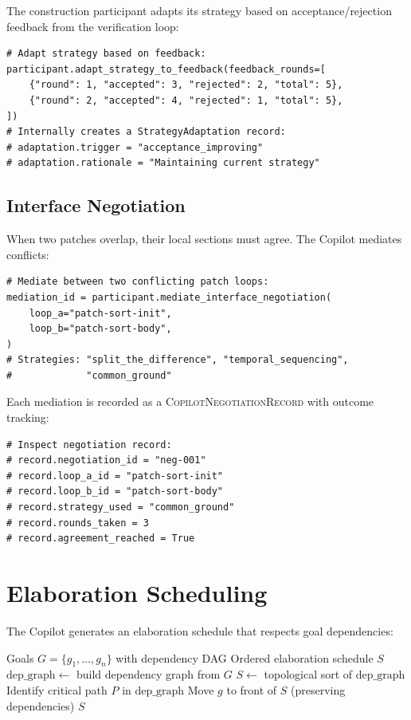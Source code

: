 \documentclass[11pt]{article}
\newcommand{\CopNeg}{\textsc{CopilotNegotiationRecord}}
\begin{document}
The construction participant adapts its strategy based on acceptance/rejection
feedback from the verification loop:

\begin{lstlisting}[style=jugeo-python]
# Adapt strategy based on feedback:
participant.adapt_strategy_to_feedback(feedback_rounds=[
    {"round": 1, "accepted": 3, "rejected": 2, "total": 5},
    {"round": 2, "accepted": 4, "rejected": 1, "total": 5},
])
# Internally creates a StrategyAdaptation record:
# adaptation.trigger = "acceptance_improving"
# adaptation.rationale = "Maintaining current strategy"
\end{lstlisting}

\subsection{Interface Negotiation}

When two patches overlap, their local sections must agree.  The Copilot
mediates conflicts:

\begin{lstlisting}[style=jugeo-python]
# Mediate between two conflicting patch loops:
mediation_id = participant.mediate_interface_negotiation(
    loop_a="patch-sort-init",
    loop_b="patch-sort-body",
)
# Strategies: "split_the_difference", "temporal_sequencing",
#             "common_ground"
\end{lstlisting}

Each mediation is recorded as a \CopNeg{} with outcome tracking:

\begin{lstlisting}[style=jugeo-python]
# Inspect negotiation record:
# record.negotiation_id = "neg-001"
# record.loop_a_id = "patch-sort-init"
# record.loop_b_id = "patch-sort-body"
# record.strategy_used = "common_ground"
# record.rounds_taken = 3
# record.agreement_reached = True
\end{lstlisting}

\section{Elaboration Scheduling}\label{sec:scheduling}

The Copilot generates an elaboration schedule that respects goal dependencies:

\begin{algorithm}[h]
\caption{Copilot-Guided Elaboration Schedule}
\label{alg:schedule}
\begin{algorithmic}[1]
\REQUIRE Goals $G = \{g_1, \ldots, g_n\}$ with dependency DAG
\ENSURE Ordered elaboration schedule $S$
\STATE $\mathrm{dep\_graph} \gets$ build dependency graph from $G$
\STATE $S \gets$ topological sort of $\mathrm{dep\_graph}$
\STATE Identify critical path $P$ in $\mathrm{dep\_graph}$
  \STATE Move $g$ to front of $S$ (preserving dependencies)
\ENDFOR
\RETURN $S$
\end{algorithmic}
\end{algorithm}
\end{document}

